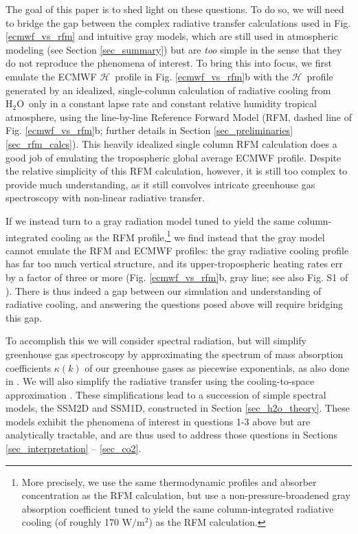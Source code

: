 \documentclass{ametsoc}
\newcommand{\Wmsq}{\ensuremath{\mathrm{W/m^2}}}
\newcommand{\cotwo}{\ensuremath{\mathrm{CO_2}}}
\newcommand{\htwo}{\ensuremath{\mathrm{H_2O}}}
\newcommand{\ch}{\ensuremath{\mathcal{H}}}
\begin{document}
The goal of this paper is to shed light on these questions. To do so, we will need to bridge the gap between the complex radiative transfer calculations used  in Fig. \ref{ecmwf_vs_rfm}  and  intuitive gray models, which are still used in atmospheric modeling (see Section \ref{sec_summary}) but are \emph{too} simple in the sense that they do not reproduce the phenomena of interest. To bring this into focus, we first emulate the ECMWF \ch\ profile in Fig. \ref{ecmwf_vs_rfm}b with the \ch\ profile generated by an idealized,
 single-column calculation of radiative cooling from \htwo\ only in a constant lapse rate and constant relative humidity tropical atmosphere, using the line-by-line Reference Forward Model (RFM, dashed line of Fig. \ref{ecmwf_vs_rfm}b;  further details in Section \ref{sec_preliminaries}\ref{sec_rfm_calcs}). This heavily idealized single column  RFM calculation does a good job of emulating the tropospheric global average ECMWF profile. Despite the relative simplicity of this RFM calculation, however, it is still too complex to provide much understanding, as it still convolves intricate greenhouse gas spectroscopy with non-linear radiative transfer. 

If we instead turn to  a gray radiation model tuned to yield the same column-integrated cooling as the RFM profile,\footnote{More precisely, we use the same thermodynamic profiles and absorber concentration as the RFM calculation, but use a non-pressure-broadened gray absorption coefficient tuned to yield the same column-integrated radiative cooling (of roughly 170 \Wmsq) as the RFM calculation.} we find instead that the gray model cannot emulate the RFM and ECMWF profiles: the gray radiative cooling profile has far too much vertical structure, and its upper-tropospheric heating rates err by a factor of three or more (Fig. \ref{ecmwf_vs_rfm}b, gray line; see also Fig. S1 of \cite{seeley2019b}). There is thus indeed a gap between our simulation and understanding of radiative cooling, and answering the questions posed above will require bridging this gap.

To accomplish this we will consider spectral radiation, but will simplify greenhouse gas spectroscopy by approximating the spectrum of mass absorption coefficients $\kappa(k)$ of our greenhouse gases as piecewise exponentials, as also done in \cite{wilson2012}. We will also simplify the radiative transfer using  the cooling-to-space approximation \citep[e.g.][]{jeevanjee2019b,petty2006, green1967,rodgers1966}. These simplifications lead to a succession of simple spectral models, the SSM2D and SSM1D, constructed in Section \ref{sec_h2o_theory}. These models exhibit the phenomena of interest in questions 1-3 above but are analytically tractable, and are thus used  to address those questions in Sections \ref{sec_interpretation} --  \ref{sec_co2}.
\end{document}
